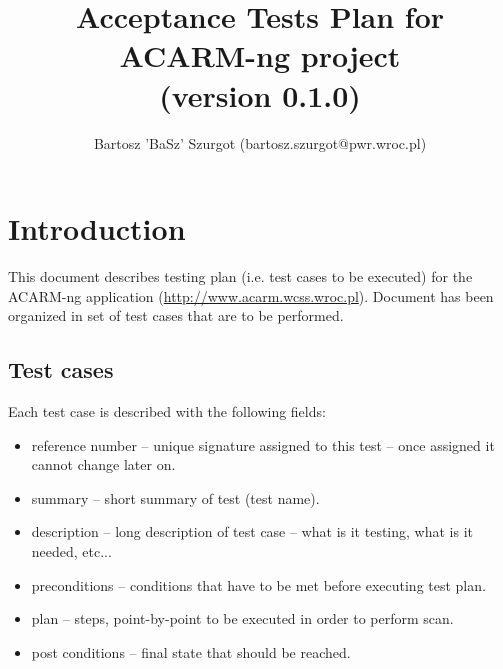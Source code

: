 \documentclass[a4paper,12pt]{article}
\title{Acceptance Tests Plan for ACARM-ng project\\(version 0.1.0)}
\author{Bartosz 'BaSz' Szurgot (bartosz.szurgot@pwr.wroc.pl)}
\begin{document}
%
%

\newcommand{\historyEntry}[3]
{
#1 & #2 & #3 \\ \hline
}

\newcommand{\testCase}[6]
{
  \subsection{#1: #2}
  \begin{tabular}{ | p{3.5cm} | p{9cm} | }
    \hline
    \textbf{Reference} & #1 \\ \hline
    \textbf{Summary} & #2 \\ \hline
    \textbf{Description} & #3 \\ \hline
    \textbf{Preconditions} & #4 \\ \hline
    \textbf{Plan} & #5 \\ \hline
    \textbf{Post conditions} & #6 \\ \hline
  \end{tabular}
}

%
%
\maketitle

\tableofcontents

\section{Introduction}

This document describes testing plan (i.e. test cases to be executed) for the ACARM-ng application
(\url{http://www.acarm.wcss.wroc.pl}). Document has been organized in set of test cases that are to be performed.

\subsection{Test cases}
Each test case is described with the following fields:
\begin{itemize}
  \item reference number -- unique signature assigned to this test -- once assigned it cannot change later on.
  \item summary -- short summary of test (test name).
  \item description -- long description of test case -- what is it testing, what is it needed, etc...
  \item preconditions -- conditions that have to be met before executing test plan.
  \item plan -- steps, point-by-point to be executed in order to perform scan.
  \item post conditions -- final state that should be reached.
\end{itemize}
\end{document}
